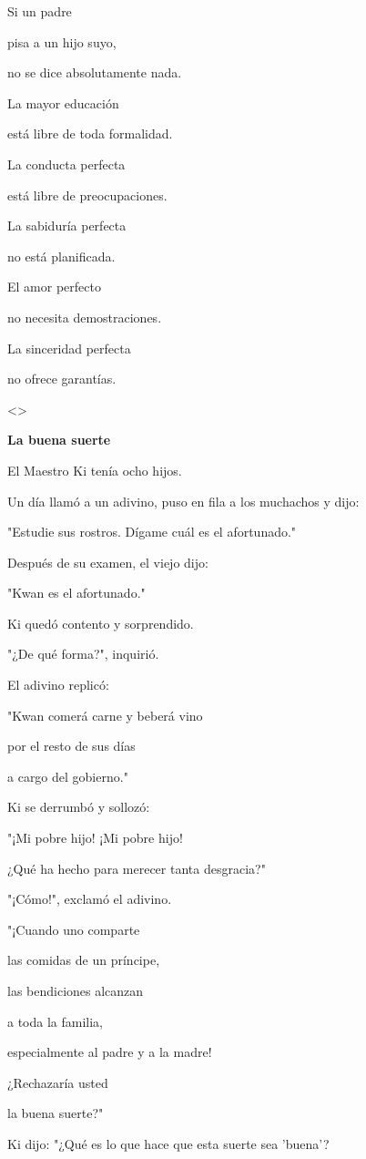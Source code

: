 Si un padre

pisa a un hijo suyo,

no se dice absolutamente nada.

La mayor educación

está libre de toda formalidad.

La conducta perfecta

está libre de preocupaciones.

La sabiduría perfecta

no está planificada.

El amor perfecto

no necesita demostraciones.

La sinceridad perfecta

no ofrece garantías.

\textless\textgreater{}

\textbf{{La buena suerte}}

El Maestro Ki tenía ocho hijos.

Un día llamó a un adivino, puso en fila a los muchachos y dijo:

"Estudie sus rostros. Dígame cuál es el afortunado."

Después de su examen, el viejo dijo:

"Kwan es el afortunado."

Ki quedó contento y sorprendido.

"¿De qué forma?", inquirió.

El adivino replicó:

"Kwan comerá carne y beberá vino

por el resto de sus días

a cargo del gobierno."

Ki se derrumbó y sollozó:

"¡Mi pobre hijo! ¡Mi pobre hijo!

¿Qué ha hecho para merecer tanta desgracia?"

"¡Cómo!", exclamó el adivino.

"¡Cuando uno comparte

las comidas de un príncipe,

las bendiciones alcanzan

a toda la familia,

especialmente al padre y a la madre!

¿Rechazaría usted

la buena suerte?"

Ki dijo: "¿Qué es lo que hace que esta suerte sea 'buena'?

